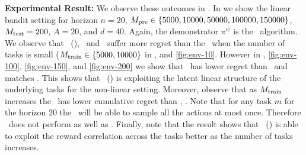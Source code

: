 \textbf{Experimental Result:} We observe these outcomes in . In  we show the linear bandit setting for horizon $n=20$, $M_{\text{pre}}  \in \{5000, 10000, 50000, 100000, 150000\}$, $M_{\text{test}} = 200$, $A=20$, and $d=40$. 
%
%
Again, the demonstrator $\pi^w$ is the \ts\ algorithm. We observe that \pred\ (\gt), \ad\ and \dptg\ suffer more regret than the \linucb\ when the number of tasks is small ($M_{\text{train}}\in\{5000, 10000\}$ in , and \ref{fig:env-10}. However in , \ref{fig:env-100}, \ref{fig:env-150}, and \ref{fig:env-200} we show that \pred\ has lower regret than \ts\ and matches \linucb. This shows that \pred\ (\gt) is exploiting the latent linear structure of the underlying tasks for the non-linear setting.
%
%
Moreover, observe that as $M_{\text{train}}$ increases the \pred\ has lower cumulative regret than \dptg, \ad. Note that for any task $m$ for the horizon $20$ the \ts\ will be able to sample all the actions at most once. Therefore \dptg\ does not perform as well as \pred.
%
%
Finally, note that the result shows that \pred\ (\gt) is able to exploit the reward correlation across the tasks better as the number of tasks increases.

%
%

